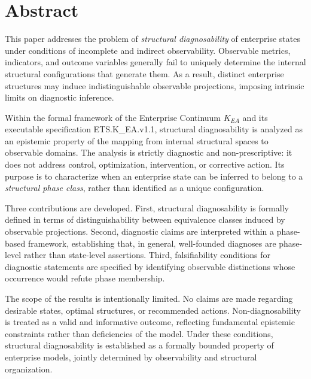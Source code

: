 ﻿\section*{Abstract}

This paper addresses the problem of \emph{structural diagnosability} of enterprise states under conditions of incomplete and indirect observability.
Observable metrics, indicators, and outcome variables generally fail to uniquely determine the internal structural configurations that generate them.
As a result, distinct enterprise structures may induce indistinguishable observable projections, imposing intrinsic limits on diagnostic inference.

Within the formal framework of the Enterprise Continuum \(K_{EA}\) and its executable specification ETS.K\_EA.v1.1, structural diagnosability is analyzed as an epistemic property of the mapping from internal structural spaces to observable domains.
The analysis is strictly diagnostic and non-prescriptive: it does not address control, optimization, intervention, or corrective action.
Its purpose is to characterize when an enterprise state can be inferred to belong to a \emph{structural phase class}, rather than identified as a unique configuration.

Three contributions are developed.
First, structural diagnosability is formally defined in terms of distinguishability between equivalence classes induced by observable projections.
Second, diagnostic claims are interpreted within a phase-based framework, establishing that, in general, well-founded diagnoses are phase-level rather than state-level assertions.
Third, falsifiability conditions for diagnostic statements are specified by identifying observable distinctions whose occurrence would refute phase membership.

The scope of the results is intentionally limited.
No claims are made regarding desirable states, optimal structures, or recommended actions.
Non-diagnosability is treated as a valid and informative outcome, reflecting fundamental epistemic constraints rather than deficiencies of the model.
Under these conditions, structural diagnosability is established as a formally bounded property of enterprise models, jointly determined by observability and structural organization.
